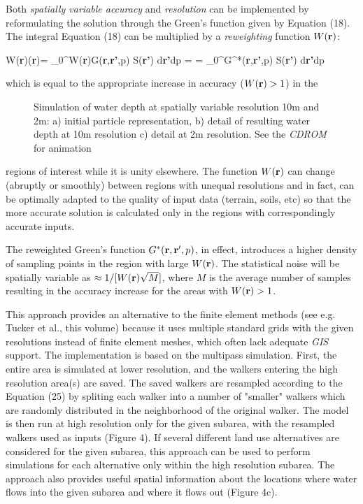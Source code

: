 \documentclass{kapedbk} %
\begin{document}
\noindent
Both {\it spatially variable accuracy} and {\it resolution} can be
implemented by reformulating the  solution through the Green's function
given by Equation (18).
The integral Equation (18) can be multiplied by a {\it reweighting }
 function  $W({\bf r})$:

\leftequation
W({\bf r})\gamma({\bf r})= \int_0^{\infty}\int W({\bf r})G({\bf r},{\bf r'},p)
 {\cal S}({\bf r'})  d{\bf r'}dp =
\endleftequation
\leftequation
= \int_0^{\infty}\int G^*({\bf r},{\bf r'},p)
 {\cal S}({\bf r'})  d{\bf r'}dp
\endleftequation

\noindent
 which is equal to the appropriate increase in accuracy ($W({\bf r})>1$) in the 

\begin{figure}[h]
\centerline{}
\caption{Simulation of water depth at spatially variable
resolution 10m and 2m: a) initial particle representation,
 b) detail of resulting water depth at 10m resolution
c) detail at 2m resolution. See the {\sl CDROM} for animation} 
\end{figure}

\noindent
regions of interest while it is unity elsewhere. The function $W({\bf r})$ can 
change (abruptly or smoothly) between regions with unequal
 resolutions  and in fact, can be optimally adapted to the quality of
 input data (terrain, soils, etc) so that the more accurate solution
 is calculated only in the regions with correspondingly accurate inputs.

 The reweighted Green's function $G^*({\bf r},{\bf r'},p)$, in effect,
  introduces a higher density of sampling points in the region with
 large $W({\bf r})$. The statistical noise will be spatially
 variable as $\approx 1/[W({\bf r})\sqrt{M}]$, where $M$ is the average number
 of samples  resulting in the accuracy increase for the areas
with $W({\bf r}) > 1$.

This approach provides an alternative to
the finite element methods (see e.g. Tucker et al., this volume)
 because it uses
multiple standard 
grids with the given resolutions
instead of finite element meshes, which often
 lack adequate {\sl GIS} support.
The implementation is based on the multipass simulation.
First, the entire area is simulated at lower resolution, and the walkers
entering the high resolution area(s) are saved.
The saved walkers are resampled according to the Equation (25) by
spliting each walker into a number of "smaller" walkers which are
randomly distributed in the neighborhood of the original walker.
The model is then run at high resolution only for the given subarea,
with the resampled walkers used as inputs (Figure 4). 
If several different land use alternatives are considered
for the given subarea, this approach can be used to perform
simulations for each alternative only within the high resolution subarea.
The approach also provides useful spatial information
about the locations where water flows into the given subarea
and where it flows out (Figure 4c).
\end{document}
